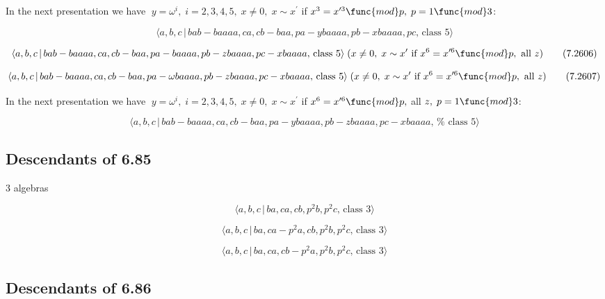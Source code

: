 \documentclass[10pt]{article}
\begin{document}
In the next presentation we have $\;y=\omega ^{i},\;i=2,3,4,5,\;x\neq
0,\;x\sim x^{\prime }$ if $x^{3}=x^{\prime 3}\func{mod}p,\;p=1\func{mod}3$:

\begin{equation}
\langle a,b,c\,|\,bab-baaaa,ca,cb-baa,pa-ybaaaa,pb-xbaaaa,pc,\,\text{class }%
5\rangle  \tag{7.2605}
\end{equation}

\begin{equation}
\langle a,b,c\,|\,bab-baaaa,ca,cb-baa,pa-baaaa,pb-zbaaaa,pc-xbaaaa,\,\text{%
class }5\rangle \;(x\neq 0,\;x\sim x^{\prime }\text{ if }x^{6}=x^{\prime 6}%
\func{mod}p,\text{ all }z)  \tag{7.2606}
\end{equation}

\begin{equation}
\langle a,b,c\,|\,bab-baaaa,ca,cb-baa,pa-\omega baaaa,pb-zbaaaa,pc-xbaaaa,\,%
\text{class }5\rangle \;(x\neq 0,\;x\sim x^{\prime }\text{ if }%
x^{6}=x^{\prime 6}\func{mod}p,\text{ all }z)  \tag{7.2607}
\end{equation}

In the next presentation we have $\;y=\omega ^{i},\;i=2,3,4,5,\;x\neq
0,\;x\sim x^{\prime }$ if $x^{6}=x^{\prime 6}\func{mod}p,$ all $z,\;p=1\func{%
mod}3$:

\begin{equation}
\langle a,b,c\,|\,bab-baaaa,ca,cb-baa,pa-ybaaaa,pb-zbaaaa,pc-xbaaaa,\,\text{%
class }5\rangle  \tag{7.2608}
\end{equation}

\subsection{Descendants of 6.85}

3 algebras

\begin{equation}
\langle a,b,c\,|\,ba,ca,cb,p^2b,p^2c,\,\text{class }3\rangle  \tag{7.2609}
\end{equation}

\begin{equation}
\langle a,b,c\,|\,ba,ca-p^2a,cb,p^2b,p^2c,\,\text{class }3\rangle 
\tag{7.2610}
\end{equation}

\begin{equation}
\langle a,b,c\,|\,ba,ca,cb-p^2a,p^2b,p^2c,\,\text{class }3\rangle 
\tag{7.2611}
\end{equation}

\subsection{Descendants of 6.86}
\end{document}
